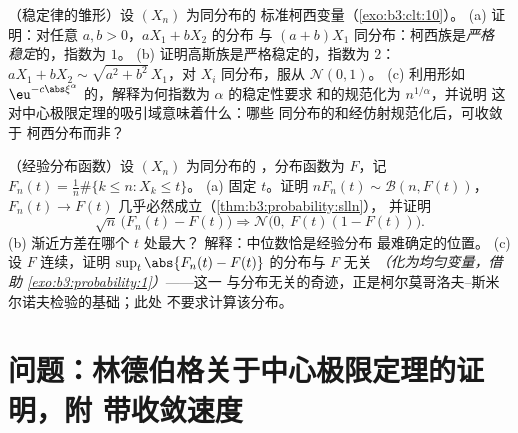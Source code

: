 \begin{exercise}[$\star\star$]\label{exo:b3:clt:11}
（稳定律的雏形）设 $(X_n)$ 为同分布的
标准柯西变量（\cref{exo:b3:clt:10}）。
(a) 证明：对任意 $a, b > 0$，$aX_1 + bX_2$ 的分布
与 $(a + b)X_1$ 同分布：柯西族是\emph{严格
稳定}的，指数为 $1$。
(b) 证明高斯族是严格稳定的，指数为
$2$：$aX_1 + bX_2 \sim \sqrt{a^2 + b^2}\,X_1$，对
$X_i$ 同分布，服从 $\mathcal N(0,1)$。
(c) 利用形如
$\eu^{-c\abs\xi^\alpha}$ 的，解释为何指数为 $\alpha$ 的稳定性要求
和的规范化为 $n^{1/\alpha}$，并说明
这对中心极限定理的吸引域意味着什么：哪些
同分布的和经仿射规范化后，可收敛于
柯西分布而非？
\end{exercise}

\begin{exercise}[$\star\star$]\label{exo:b3:clt:12}
（经验分布函数）设 $(X_n)$ 为同分布的
，分布函数为 $F$，记 $F_n(t) =
\frac1n\#\{k \leq n : X_k \leq t\}$。
(a) 固定 $t$。证明 $n F_n(t) \sim \mathcal B(n, F(t))$，
$F_n(t) \to F(t)$ 几乎必然成立（\cref{thm:b3:probability:slln}），
并证明
\[
\sqrt n\,\bigl(F_n(t) - F(t)\bigr) \Longrightarrow
\mathcal N\bigl(0,\ F(t)(1 - F(t))\bigr) .
\]
(b) 渐近方差在哪个 $t$ 处最大？
解释：中位数恰是经验分布
最难确定的位置。
(c) 设 $F$ 连续，证明
$\sup_t\abs{F_n(t) - F(t)}$ 的分布与 $F$ 无关
\emph{（化为均匀变量，借助
\cref{exo:b3:probability:1}）}——这一
与分布无关的奇迹，正是柯尔莫哥洛夫--斯米尔诺夫检验的基础；此处
不要求计算该分布。
\end{exercise}

\section{问题：林德伯格关于中心极限定理的证明，附
带收敛速度}

